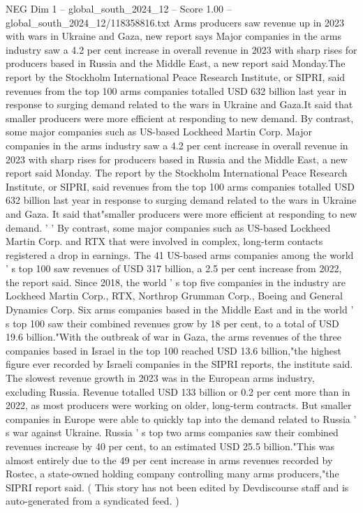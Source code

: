 \begin{textsample}{NEG Dim 1 – global\_south\_2024\_12 – Score 1.00 – global\_south\_2024\_12/118358816.txt}  \label{ex:f1_neg_342}
Arms producers saw revenue up in 2023 with wars in Ukraine and Gaza, new report says Major companies in the arms industry saw a 4.2 per cent increase in overall revenue in 2023 with sharp rises for producers based in Russia and the Middle East, a new report said Monday.The report by the Stockholm International Peace Research Institute, or SIPRI, said revenues from the top 100 arms companies totalled USD 632 billion last year in response to surging demand related to the wars in Ukraine and Gaza.It said that smaller producers were more efficient at responding to new demand.
By contrast, some major companies such as US-based Lockheed Martin Corp.
Major companies in the arms industry saw a 4.2 per cent increase in overall revenue in 2023 with sharp rises for producers based in Russia and the Middle East, a new report said Monday.
The report by the Stockholm International Peace Research Institute, or SIPRI, said revenues from the top 100 arms companies totalled USD 632 billion last year in response to surging demand related to the wars in Ukraine and Gaza.
It said that"smaller producers were more efficient at responding to new demand. ' ' By contrast, some major companies such as US-based Lockheed Martin Corp. and RTX that were involved in complex, long-term contacts registered a drop in earnings.
The 41 US-based arms companies among the world ' s top 100 saw revenues of USD 317 billion, a 2.5 per cent increase from 2022, the report said.
Since 2018, the world ' s top five companies in the industry are Lockheed Martin Corp., RTX, Northrop Grumman Corp., Boeing and General Dynamics Corp.
Six arms companies based in the Middle East and in the world ' s top 100 saw their combined revenues grow by 18 per cent, to a total of USD 19.6 billion."With the outbreak of war in Gaza, the arms revenues of the three companies based in Israel in the top 100 reached USD 13.6 billion,"the highest figure ever recorded by Israeli companies in the SIPRI reports, the institute said.
The slowest revenue growth in 2023 was in the European arms industry, excluding Russia.
Revenue totalled USD 133 billion or 0.2 per cent more than in 2022, as most producers were working on older, long-term contracts.
But smaller companies in Europe were able to quickly tap into the demand related to Russia ' s war against Ukraine.
Russia ' s top two arms companies saw their combined revenues increase by 40 per cent, to an estimated USD 25.5 billion."This was almost entirely due to the 49 per cent increase in arms revenues recorded by Rostec, a state-owned holding company controlling many arms producers,"the SIPRI report said. ( This story has not been edited by Devdiscourse staff and is auto-generated from a syndicated feed. )

\end{textsample}
